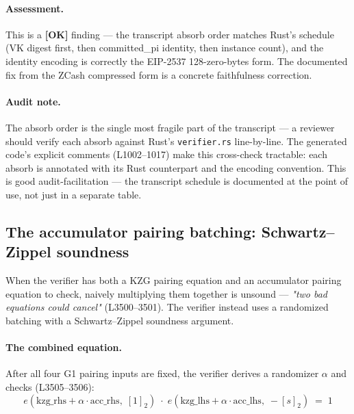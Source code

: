 \paragraph{Assessment.} This is a
\textcolor{tracegreen}{\textbf{[OK]}} finding --- the transcript
absorb order matches Rust's schedule (VK digest first, then
committed\_pi identity, then instance count), and the identity
encoding is correctly the EIP-2537 128-zero-bytes form. The
documented fix from the ZCash compressed form is a concrete
faithfulness correction.

\paragraph{Audit note.} The absorb order is the single most
fragile part of the transcript --- a reviewer should verify each
absorb against Rust's \texttt{verifier.rs} line-by-line. The
generated code's explicit comments (L1002--1017) make this
cross-check tractable: each absorb is annotated with its Rust
counterpart and the encoding convention. This is good
audit-facilitation --- the transcript schedule is documented at
the point of use, not just in a separate table.

\subsection{The accumulator pairing batching: Schwartz--Zippel soundness}
\label{sec:pr-acc-batch}

When the verifier has both a KZG pairing equation and an
accumulator pairing equation to check, naively multiplying them
together is unsound --- \emph{"two bad equations could cancel"}
(L3500--3501). The verifier instead uses a randomized batching
with a Schwartz--Zippel soundness argument.

\paragraph{The combined equation.} After all four G1 pairing
inputs are fixed, the verifier derives a randomizer $\alpha$ and
checks (L3505--3506):
\[
e(\text{kzg\_rhs} + \alpha\cdot\text{acc\_rhs},\; [1]_2)\;\cdot\;
e(\text{kzg\_lhs} + \alpha\cdot\text{acc\_lhs},\; -[s]_2) \;=\; 1
\]

